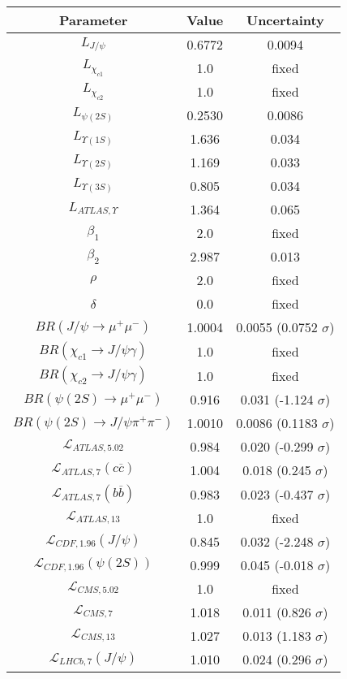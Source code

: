 \begin{table}[h!]
\centering
\begin{tabular}{c|c|c}
Parameter & Value & Uncertainty \\
\hline
$L_{J/\psi}$ & 0.6772 & 0.0094 \\
$L_{\chi_{c1}}$ & 1.0 & fixed \\
$L_{\chi_{c2}}$ & 1.0 & fixed \\
$L_{\psi(2S)}$ & 0.2530 & 0.0086 \\
$L_{\Upsilon(1S)}$ & 1.636 & 0.034 \\
$L_{\Upsilon(2S)}$ & 1.169 & 0.033 \\
$L_{\Upsilon(3S)}$ & 0.805 & 0.034 \\
$L_{ATLAS,\Upsilon}$ & 1.364 & 0.065 \\
$\beta_1$ & 2.0 & fixed \\
$\beta_2$ & 2.987 & 0.013 \\
$\rho$ & 2.0 & fixed \\
$\delta$ & 0.0 & fixed \\
$BR(J/\psi\rightarrow\mu^+\mu^-)$ & 1.0004 & 0.0055 (0.0752 $\sigma$) \\
$BR(\chi_{c1}\rightarrow J/\psi\gamma)$ & 1.0 & fixed \\
$BR(\chi_{c2}\rightarrow J/\psi\gamma)$ & 1.0 & fixed \\
$BR(\psi(2S)\rightarrow\mu^+\mu^-)$ & 0.916 & 0.031 (-1.124 $\sigma$) \\
$BR(\psi(2S)\rightarrow J/\psi\pi^+\pi^-)$ & 1.0010 & 0.0086 (0.1183 $\sigma$) \\
$\mathcal L_{ATLAS,5.02}$ & 0.984 & 0.020 (-0.299 $\sigma$) \\
$\mathcal L_{ATLAS,7}(c\overline c)$ & 1.004 & 0.018 (0.245 $\sigma$) \\
$\mathcal L_{ATLAS,7}(b\overline b)$ & 0.983 & 0.023 (-0.437 $\sigma$) \\
$\mathcal L_{ATLAS,13}$ & 1.0 & fixed \\
$\mathcal L_{CDF,1.96}(J/\psi)$ & 0.845 & 0.032 (-2.248 $\sigma$) \\
$\mathcal L_{CDF,1.96}(\psi(2S))$ & 0.999 & 0.045 (-0.018 $\sigma$) \\
$\mathcal L_{CMS,5.02}$ & 1.0 & fixed \\
$\mathcal L_{CMS,7}$ & 1.018 & 0.011 (0.826 $\sigma$) \\
$\mathcal L_{CMS,13}$ & 1.027 & 0.013 (1.183 $\sigma$) \\
$\mathcal L_{LHCb,7}(J/\psi)$ & 1.010 & 0.024 (0.296 $\sigma$) \\

\end{tabular}
\end{table}
